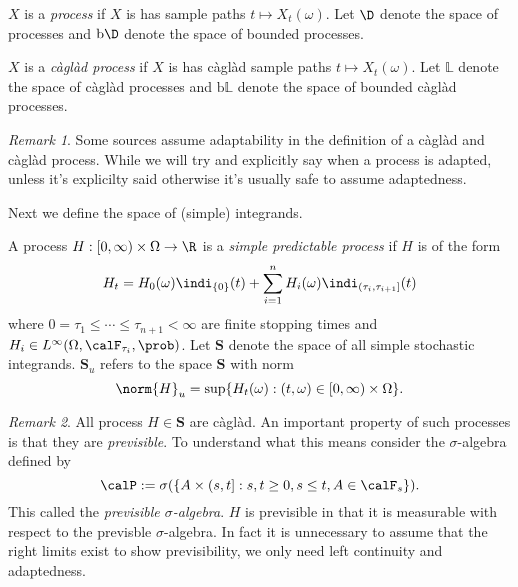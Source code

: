 \documentclass{scrreprt}
\theoremstyle{remark}
\newtheorem{remark}{Remark}
\newcommand{\caglad}{c\`agl\`ad}
\newcommand{\simpro}{\mathbf S}
\newcommand{\bdd}{\text{b}}
\newcommand\defeq{:=}
\begin{document}
\begin{defn}
	$X$ is a \emph{\cadlag{} process} if $X$ is has \cadlag{} sample paths $t \mapsto X_t(\omega)$. Let $\D$ denote the space of \cadlag{} processes and $\bdd \D$ denote the space of bounded \cadlag{} processes.
\end{defn}

\begin{defn}
	$X$ is a \emph{\caglad{} process} if $X$ is has \caglad{} sample paths $t \mapsto X_t(\omega)$. Let $\mathbb L$ denote the space of \caglad{} processes and $\bdd \mathbb L$ denote the space of bounded \caglad{} processes.
\end{defn}

\begin{remark}
	Some sources assume adaptability in the definition of a \caglad{} and \caglad{} process. While we will try and explicitly say when a process is adapted, unless it's explicilty said otherwise it's usually safe to assume adaptedness.
\end{remark}

Next we define the space of (simple) integrands.

\begin{defn}
	A process $H: [0, \infty) \times \Omega \to \R$ is a \emph{simple predictable process} if $H$ is of the form
	\begin{equation}
		\label{eq:simpro-form}
		H_t = H_0(\omega) \indi_{\{0\}}(t) + \sum_{i=1}^n H_i(\omega) \indi_{(\tau_i, \tau_{i+1}]}(t)
	\end{equation}
	where $0 = \tau_1 \leq \cdots \leq \tau_{n+1} < \infty$ are finite stopping times and $H_i \in L^{\infty}(\Omega, \calF_{\tau_i}, \prob)$. Let $\simpro$ denote the space of all simple stochastic integrands. $\simpro_u$ refers to the space $\simpro$ with norm
	\begin{equation}
		\norm{H}_u = \sup\{H_t(\omega) : (t, \omega) \in [0, \infty) \times \Omega\}.
	\end{equation}
\end{defn}

\begin{remark}
	All process $H \in \simpro$ are \caglad{}. An important property of such processes is that they are \emph{previsible}. To understand what this means consider the $\sigma$-algebra defined by
	\begin{equation}
		\calP \defeq \sigma(\{A \times (s, t] : s, t \geq 0, s \leq t, A \in \calF_s\}).
	\end{equation}
	This called the \emph{previsible $\sigma$-algebra}. $H$ is previsible in that it is measurable with respect to the previsble $\sigma$-algebra. In fact it is unnecessary to assume that the right limits exist to show previsibility, we only need left continuity and adaptedness.
\end{remark}
\end{document}
